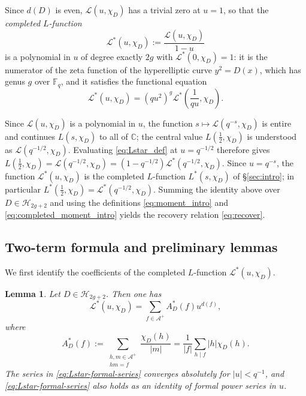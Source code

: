 \documentclass[a4paper,reqno]{amsart}
\numberwithin{equation}{section}
\newtheorem{lemma}[theorem]{Lemma}
\theoremstyle{remark}
\theoremstyle{definition}
\newcommand{\A}{\mathcal{A}}
\begin{document}
Since $d(D)$ is even, $\mathcal L(u,\chi_D)$ has a trivial zero at $u=1$, so
that the \emph{completed $L$-function}
\begin{equation}\label{eq:Lstar_def}
\mathcal L^*(u,\chi_D)
:=
\frac{\mathcal L(u,\chi_D)}{1-u}
\end{equation}
is a polynomial in $u$ of degree exactly $2g$ with
$\mathcal L^*(0,\chi_D)=1$: it is the numerator of the zeta function of the
hyperelliptic curve $y^2=D(x)$, which has genus $g$ over $\mathbb F_q$, and
it satisfies the functional equation
\begin{equation}\label{eq:FE_Lstar}
\mathcal L^*(u,\chi_D)
=
(qu^2)^g
\mathcal L^*\!\left(\frac{1}{qu},\chi_D\right).
\end{equation}

Since $\mathcal L(u,\chi_D)$ is a polynomial in $u$, the function
$s\mapsto\mathcal L(q^{-s},\chi_D)$ is entire and continues $L(s,\chi_D)$
to all of $\mathbb C$; the central value $L(\tfrac12,\chi_D)$ is understood
as $\mathcal L(q^{-1/2},\chi_D)$.
Evaluating \eqref{eq:Lstar_def} at $u=q^{-1/2}$ therefore gives
$L\!\left(\tfrac12,\chi_D\right) = \mathcal L(q^{-1/2},\chi_D) = (1-q^{-1/2}) \mathcal L^*(q^{-1/2},\chi_D)$.
Since $u=q^{-s}$, the function $\mathcal L^*(u,\chi_D)$ is the completed
$L$-function $L^*(s,\chi_D)$ of \S\ref{sec:intro}; in particular
$L^*\!\left(\tfrac12,\chi_D\right)=\mathcal L^*(q^{-1/2},\chi_D)$. Summing
the identity above over $D\in\mathcal H_{2g+2}$ and using the definitions
\eqref{eq:moment_intro} and \eqref{eq:completed_moment_intro} yields the
recovery relation \eqref{eq:recover}.

\subsection{Two-term formula and preliminary lemmas}

We first identify the coefficients of the completed $L$-function
$\mathcal L^*(u,\chi_D)$.

\begin{lemma}
Let $D\in\mathcal H_{2g+2}$. Then one has 
\begin{equation}\label{eq:Lstar-formal-series}
\mathcal L^*(u,\chi_D)
=
\sum_{f\in\A^+}A_D^*(f)u^{d(f)},
\end{equation}
where
\begin{equation}\label{eq:Astar}
A_D^*(f)
:=
\sum_{\substack{h,m\in\A^+\\ hm=f}}
\frac{\chi_D(h)}{|m|}
=
\frac{1}{|f|}
\sum_{h\mid f}|h|\chi_D(h).
\end{equation}
The series in \eqref{eq:Lstar-formal-series} converges absolutely for
$|u|<q^{-1}$, and \eqref{eq:Lstar-formal-series} also holds as an identity
of formal power series in $u$.
\end{lemma}
\end{document}
